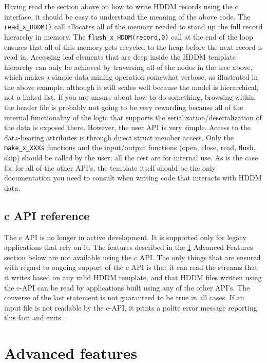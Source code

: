 \documentclass{revtex4}
\begin{document}
Having read the section above on how to write HDDM records using the c
interface, it should be easy to understand the meaning of the above code.
The \texttt{read\_x\_HDDM()} call allocates all of the memory needed to
stand up the full record hierarchy in memory. The \texttt{flush\_x\_HDDM(record,0)}
call at the end of the loop ensures that all of this memory gets recycled
to the heap before the next record is read in. Accessing leaf elements that
are deep inside the HDDM template hierarchy can only be achieved by traversing
all of the nodes in the tree above, which makes a simple data mining operation
somewhat verbose, as illustrated in the above example, although it still scales
well because the model is hierarchical, not a linked list. If you are unsure
about how to do something, browsing within the header file is probably not
going to be very rewarding because all of the internal functionality of the
logic that supports the serialization/deserialization of the data is exposed
there. However, the user API is very simple. Access to the data-bearing attributes
is through direct struct member access. Only the \texttt{make\_x\_XXXs} functions
and the input/output functions (open, close, read, flush, skip) should be called
by the user; all the rest are for internal use. As is the case for for all of the
other API's, the template itself should be the only documentation
you need to consult when writing code that interacts with HDDM data.

\subsection{c API reference}

The c API is no longer in active development. It is supported only for legacy
applications that rely on it. The features described in the \ref{Advanced_features}
{Advanced Features} section below are not available using the c API. The only things
that are ensured with regard to ongoing support of the c API is that it can read
the streams that it writes based on any valid HDDM template, and that HDDM files
written using the c-API can be read by applications built using any of the other
API's. The converse of the last statement is not guaranteed to
be true in all cases. If an input file is not readable by the c-{}API, it prints
a polite error message reporting this fact and exits.

\section{Advanced features}\label{Advanced_features}
\end{document}

